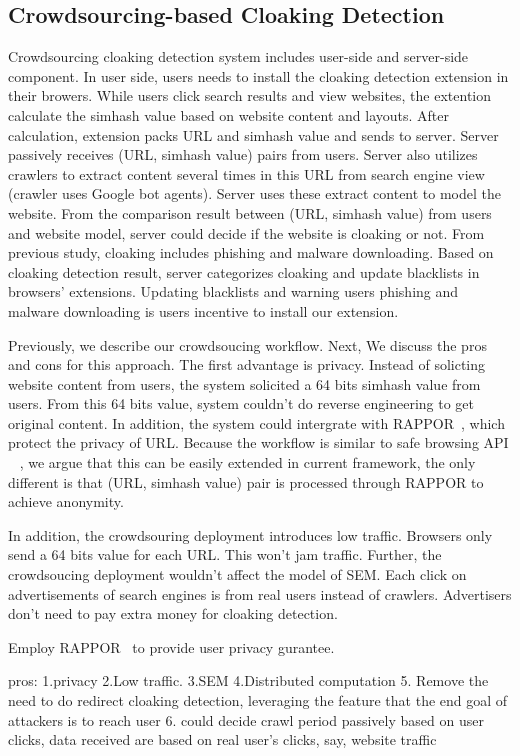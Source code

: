 \subsection{Crowdsourcing-based Cloaking Detection}
Crowdsourcing cloaking detection system includes user-side and server-side component. In user side, users needs to install the cloaking
detection extension in their browers. While users click search results and view websites, the extention calculate the simhash value based on 
website content and layouts. After calculation, extension packs URL and simhash value and sends to server. Server passively receives (URL, simhash value)
pairs from users. Server also utilizes crawlers to extract content several times in this URL from search engine view (crawler uses Google bot agents).
Server uses these extract content to model the website. From the comparison result between (URL, simhash value) from users and website model,
server could decide if the website is cloaking or not. From previous study, cloaking includes phishing and malware downloading. Based on cloaking
detection result, server categorizes cloaking and update blacklists in browsers' extensions. Updating blacklists and warning users phishing and
malware downloading is users incentive to install our extension.

Previously, we describe our crowdsoucing workflow. Next, We discuss the pros and cons for this approach. The first advantage is privacy. Instead of solicting
website content from users, the system solicited a 64 bits simhash value from users. From this 64 bits value, system couldn't do reverse engineering to
get original content. In addition, the system could intergrate with RAPPOR~\cite{erlingsson2014rappor}, which protect the privacy of URL.
Because the workflow is similar to safe browsing API ~\cite{rajab2013camp} , we argue that this can be easily
extended in current framework, the only different is that (URL, simhash value)
pair is processed through RAPPOR to achieve anonymity.

In addition, the crowdsouring deployment introduces low traffic. Browsers only send a 64 bits value for
each URL. This won't jam traffic. Further, the crowdsoucing deployment wouldn't affect the model of SEM. Each click on advertisements of search engines is
from real users instead of crawlers. Advertisers don't need to pay extra money for cloaking detection. 


Employ RAPPOR~\cite{erlingsson2014rappor} to provide user privacy gurantee.

pros: 	1.privacy 2.Low traffic. 3.SEM 4.Distributed computation 
5. Remove the need to do redirect cloaking detection, leveraging the feature
that the end goal of attackers is to reach user
6. could decide crawl period passively based on user clicks, data received are
based on real user’s clicks, say, website traffic
%


